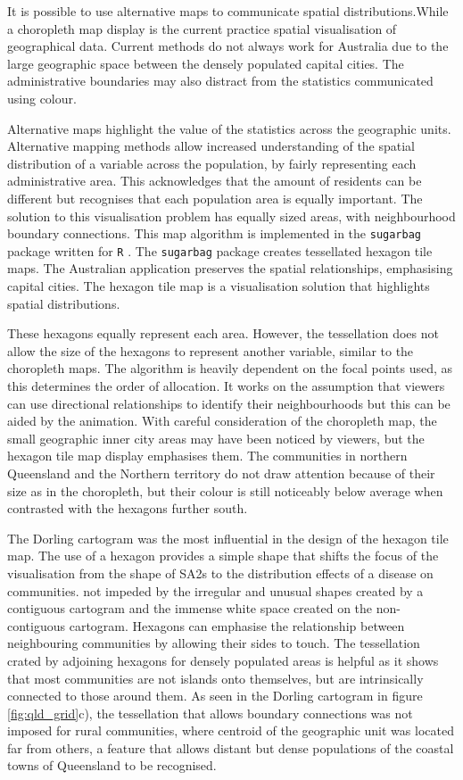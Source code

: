 It is possible to use alternative maps to communicate spatial
distributions.While a choropleth map display is the current practice
spatial visualisation of geographical data. Current methods do not
always work for Australia due to the large geographic space between the
densely populated capital cities. The administrative boundaries may also
distract from the statistics communicated using colour.

Alternative maps highlight the value of the statistics across the
geographic units. Alternative mapping methods allow increased
understanding of the spatial distribution of a variable across the
population, by fairly representing each administrative area. This
acknowledges that the amount of residents can be different but
recognises that each population area is equally important. The solution
to this visualisation problem has equally sized areas, with
neighbourhood boundary connections. This map algorithm is implemented in
the \texttt{sugarbag} \citep{sugarbag} package written for \texttt{R}
\citep{R}. The \texttt{sugarbag} package creates tessellated hexagon
tile maps. The Australian application preserves the spatial
relationships, emphasising capital cities. The hexagon tile map is a
visualisation solution that highlights spatial distributions.

These hexagons equally represent each area. However, the tessellation
does not allow the size of the hexagons to represent another variable,
similar to the choropleth maps. The algorithm is heavily dependent on
the focal points used, as this determines the order of allocation. It
works on the assumption that viewers can use directional relationships
to identify their neighbourhoods but this can be aided by the animation.
With careful consideration of the choropleth map, the small geographic
inner city areas may have been noticed by viewers, but the hexagon tile
map display emphasises them. The communities in northern Queensland and
the Northern territory do not draw attention because of their size as in
the choropleth, but their colour is still noticeably below average when
contrasted with the hexagons further south.

The Dorling cartogram was the most influential in the design of the
hexagon tile map. The use of a hexagon provides a simple shape that
shifts the focus of the visualisation from the shape of SA2s to the
distribution effects of a disease on communities. not impeded by the
irregular and unusual shapes created by a contiguous cartogram and the
immense white space created on the non-contiguous cartogram. Hexagons
can emphasise the relationship between neighbouring communities by
allowing their sides to touch. The tessellation crated by adjoining
hexagons for densely populated areas is helpful as it shows that most
communities are not islands onto themselves, but are intrinsically
connected to those around them. As seen in the Dorling cartogram in
figure \ref{fig:qld_grid}c), the tessellation that allows boundary
connections was not imposed for rural communities, where centroid of the
geographic unit was located far from others, a feature that allows
distant but dense populations of the coastal towns of Queensland to be
recognised.

